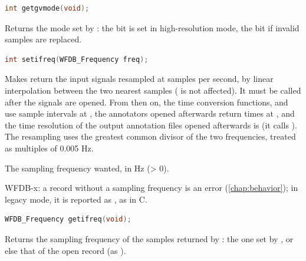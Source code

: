 \begin{lstlisting}[language=C,style=signature]
int getgvmode(void);
\end{lstlisting}
Returns the mode set by : the  bit is
set in high-resolution mode, the  bit if invalid samples
are replaced.

\begin{lstlisting}[language=C,style=signature]
int setifreq(WFDB_Frequency freq);
\end{lstlisting}
Makes  return the input signals resampled at  samples
per second, by linear interpolation between the two nearest samples
( is not affected). It must be called after the signals are
opened. From then on, the time conversion functions,  and
 use sample intervals at , the annotators opened
afterwards return times at , and the time resolution of the output
annotation files opened afterwards is  (it calls
). The resampling uses the greatest common divisor of the
two frequencies, treated as multiples of 0.005 Hz.
\begin{params}
\item[freq] The sampling frequency wanted, in Hz (> 0).
\end{params}

WFDB-x: a record without a sampling frequency is an error
(\cref{chap:behavior}); in legacy mode, it is reported as , as in C.

\begin{lstlisting}[language=C,style=signature]
WFDB_Frequency getifreq(void);
\end{lstlisting}
Returns the sampling frequency of the samples returned by : the
one set by , or else that of the open record (as
).

